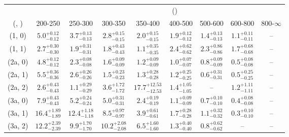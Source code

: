 \begin{table}[h!]
\tiny
\centering
{}
\begin{tabular}
{ccccccccc}
	\hline\hline
&	& \multicolumn{8}{c}{\scalht (\gev)} \\ 
	 (\njet,  \nb) & 200-250 & 250-300 & 300-350 & 350-400 & 400-500 & 500-600 & 600-800 & 800-$\infty$ \\ [0.8ex] 
\hline
	(1, 0) & $5.0^{+ 0.12 }_{- 0.12 }$ & $3.7^{+ 0.13 }_{- 0.13 }$ & $2.8^{+ 0.15 }_{- 0.15 }$ & $2.0^{+ 0.15 }_{- 0.15 }$ & $1.9^{+ 0.12 }_{- 0.12 }$ & $1.4^{+ 0.13 }_{- 0.13 }$ & $1.1^{+ 0.11 }_{- 0.11 }$ & -- \\[0.5ex] 
	(1, 1) & $2.7^{+ 0.30 }_{- 0.30 }$ & $1.9^{+ 0.31 }_{- 0.31 }$ & $1.8^{+ 0.43 }_{- 0.43 }$ & $1.1^{+ 0.35 }_{- 0.35 }$ & $2.4^{+ 0.62 }_{- 0.62 }$ & $2.3^{+ 0.86 }_{- 0.86 }$ & $1.7^{+ 0.68 }_{- 0.68 }$ & -- \\[0.5ex] 
	(2a, 0) & $4.8^{+ 0.12 }_{- 0.12 }$ & $2.3^{+ 0.08 }_{- 0.08 }$ & $1.6^{+ 0.09 }_{- 0.09 }$ & $1.2^{+ 0.09 }_{- 0.09 }$ & $1.0^{+ 0.07 }_{- 0.07 }$ & $0.8^{+ 0.09 }_{- 0.09 }$ & $0.5^{+ 0.08 }_{- 0.08 }$ & -- \\[0.5ex] 
	(2a, 1) & $5.5^{+ 0.36 }_{- 0.36 }$ & $2.6^{+ 0.26 }_{- 0.26 }$ & $1.5^{+ 0.23 }_{- 0.23 }$ & $1.3^{+ 0.28 }_{- 0.28 }$ & $1.2^{+ 0.25 }_{- 0.25 }$ & $0.6^{+ 0.31 }_{- 0.31 }$ & $0.5^{+ 0.25 }_{- 0.25 }$ & -- \\[0.5ex] 
	(2a, 2) & $2.6^{+ 0.43 }_{- 0.43 }$ & $1.1^{+ 0.29 }_{- 0.29 }$ & $3.6^{+ 1.72 }_{- 1.72 }$ & $17.7^{+ 12.53 }_{- 12.53 }$ & $1.4^{+ 1.05 }_{- 1.05 }$ & -- & $1.2^{+ 1.11 }_{- 1.11 }$ & -- \\[0.5ex] 
	(3a, 0) & $7.9^{+ 0.43 }_{- 0.43 }$ & $5.2^{+ 0.24 }_{- 0.24 }$ & $5.0^{+ 0.31 }_{- 0.31 }$ & $2.4^{+ 0.19 }_{- 0.19 }$ & $1.1^{+ 0.09 }_{- 0.09 }$ & $0.7^{+ 0.10 }_{- 0.10 }$ & $0.4^{+ 0.08 }_{- 0.08 }$ & -- \\[0.5ex] 
	(3a, 1) & $16.4^{+ 1.89 }_{- 1.89 }$ & $12.4^{+ 1.18 }_{- 1.18 }$ & $8.5^{+ 0.97 }_{- 0.97 }$ & $3.9^{+ 0.61 }_{- 0.61 }$ & $1.7^{+ 0.28 }_{- 0.28 }$ & $1.1^{+ 0.32 }_{- 0.32 }$ & $0.3^{+ 0.10 }_{- 0.10 }$ & -- \\[0.5ex] 
	(3a, 2) & $12.2^{+ 2.39 }_{- 2.39 }$ & $9.9^{+ 1.70 }_{- 1.70 }$ & $10.2^{+ 2.08 }_{- 2.08 }$ & $6.5^{+ 1.60 }_{- 1.60 }$ & $1.3^{+ 0.40 }_{- 0.40 }$ & $0.8^{+ 0.62 }_{- 0.62 }$ & -- & -- \\[0.5ex] 

\end{tabular}
\end{table}
